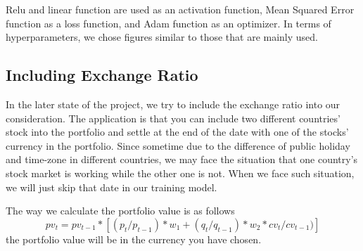 Relu and linear function are used as an activation function, Mean Squared Error function as a loss function, and Adam function as an optimizer. In terms of hyperparameters, we chose figures similar to those that are mainly used. 

\subsection{Including Exchange Ratio}
In the later state of the project, we try to include the exchange ratio into our consideration. The application is that you can include two different countries' stock into the portfolio and settle at the end of the date with one of the stocks' currency in the portfolio. Since sometime due to the difference of public holiday and time-zone in different countries, we may face the situation that one country's stock market is working while the other one is not. When we face such situation, we will just skip that date in our training model.

The way we calculate the portfolio value is as follows
$$ pv_{t} = pv_{t-1} *[ (p_{t} / p_{t-1}) * w_{1}  + (q_{t} / q_{t-1}) * w_{2} * cv_{t}/cv_{t-1})]$$
the portfolio value will be in the currency you have chosen.
\endinput



